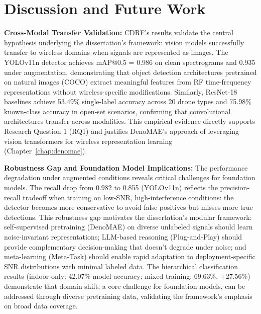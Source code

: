 


\section{Discussion and Future Work}
\label{sec:discussion}

\textbf{Cross-Modal Transfer Validation:} CDRF's results validate the central hypothesis underlying the dissertation's framework: vision models successfully transfer to wireless domains when signals are represented as images. The YOLOv11n detector achieves mAP@0.5 = 0.986 on clean spectrograms and 0.935 under augmentation, demonstrating that object detection architectures pretrained on natural images (COCO) extract meaningful features from RF time-frequency representations without wireless-specific modifications. Similarly, ResNet-18 baselines achieve 53.49\% single-label accuracy across 20 drone types and 75.98\% known-class accuracy in open-set scenarios, confirming that convolutional architectures transfer across modalities. This empirical evidence directly supports Research Question 1 (RQ1) and justifies DenoMAE's approach of leveraging vision transformers for wireless representation learning (Chapter~\ref{chap:denomae}).

\textbf{Robustness Gap and Foundation Model Implications:} The performance degradation under augmented conditions reveals critical challenges for foundation models. The recall drop from 0.982 to 0.855 (YOLOv11n) reflects the precision-recall tradeoff when training on low-SNR, high-interference conditions: the detector becomes more conservative to avoid false positives but misses more true detections. This robustness gap motivates the dissertation's modular framework: self-supervised pretraining (DenoMAE) on diverse unlabeled signals should learn noise-invariant representations; LLM-based reasoning (Plug-and-Play) should provide complementary decision-making that doesn't degrade under noise; and meta-learning (Meta-Task) should enable rapid adaptation to deployment-specific SNR distributions with minimal labeled data. The hierarchical classification results (indoor-only: 42.07\% model accuracy; mixed training: 69.63\%, +27.56\%) demonstrate that domain shift, a core challenge for foundation models, can be addressed through diverse pretraining data, validating the framework's emphasis on broad data coverage.

